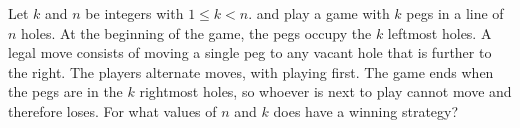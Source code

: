 Let $k$ and $n$ be integers with $1\leq k<n$.  and  play a game with $k$ pegs in a line of $n$ holes. At the beginning of the game, the pegs occupy the $k$ leftmost holes. A legal move consists of moving a single peg to any vacant hole that is further to the right. The players alternate moves, with  playing first. The game ends when the pegs are in the $k$ rightmost holes, so whoever is next to play cannot move and therefore loses. For what values of $n$ and $k$ does  have a winning strategy?
